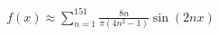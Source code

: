 \documentclass[preview]{standalone}
\begin{document}
\begin{align*}
f(x) \approx \sum_{n=1}^{151} \frac{8n}{\pi(4n^2-1)} \sin(2nx)
\end{align*}
\end{document}
